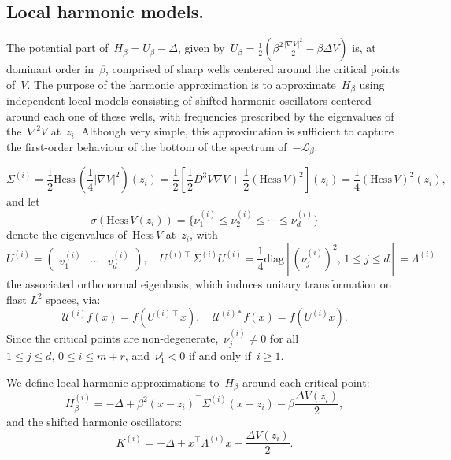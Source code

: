 \documentclass[10pt]{article}
\newcommand{\cL}{\mathcal{L}}
\newcommand{\Hess}{\mathrm{Hess}\,}
\newcommand{\1}{\mathbbm 1}
\newcommand{\Ki}[1]{K^{(i)}_{#1}}
\begin{document}
    \subsection{Local harmonic models.\newline}\label{subsec:local_oscillators}
    The potential part of~$H_\beta = U_\beta - \Delta$, given by~$U_\beta=\frac12\left(\beta^2\frac{|\nabla V|^2}2-\beta\Delta V\right)$ is, at dominant order in~$\beta$, comprised of sharp wells centered around the critical points of~$V$. 
    The purpose of the harmonic approximation is to approximate~$H_\beta$ using independent local models consisting of shifted harmonic oscillators centered around each one of these wells, with frequencies prescribed by the eigenvalues of the~$\nabla^2 V$ at~$z_i$.
    Although very simple, this approximation is sufficient to capture the first-order behaviour of the bottom of the spectrum of~$-\cL_\beta$. 

    \[\Sigma^{(i)} = \frac12\Hess (\frac14|\nabla V|^2)(z_i)  = \frac12\left[\frac12 D^3 V \nabla V + \frac12 \left( \Hess V\right)^2 \right](z_i) = \frac14 \left(\Hess V\right)^2(z_i),\]
    and let
    \[\sigma(\Hess V(z_i)) = \{\nu_1^{(i)} \leq \nu_2^{(i)} \leq \dotsm \leq \nu_d^{(i)}\}\]
    denote the eigenvalues of~$\Hess V$ at~$z_i$, with
    \[U^{(i)} =\begin{pmatrix}v_1^{(i)}&\dotsm&v_d^{(i)}\end{pmatrix},\quad U^{(i)\intercal} \Sigma^{(i)} U^{(i)} = \frac14\mathrm{diag}\left[\left(\nu_j^{(i)}\right)^2,\,1\leq j\leq d\right] = \Lambda^{(i)}\]
    the associated orthonormal eigenbasis, which induces unitary transformation on flast $L^2$ spaces, via:
   ~$$ \mathcal U^{(i)} f(x) = f\left( U^{(i)\intercal}x\right),\quad \mathcal U^{(i)*} f(x) = f\left( U^{(i)}x\right).$$
    Since the critical points are non-degenerate,~$\nu_j^{(i)} \neq 0$ for all~$1\leq j\leq d,\,0\leq i \leq m+r$, and~$\nu_1^{i} < 0$ if and only if~$i\geq 1$.
    
    We define local harmonic approximations to~$H_\beta$ around each critical point:
    \[ H_\beta^{(i)} = -\Delta + \beta^2 (x-z_i)^\intercal \Sigma^{(i)}(x-z_i) - \beta \frac{\Delta V(z_i)}2, \]
    and the shifted harmonic oscillators:
    \[\Ki{} = -\Delta  + x^\intercal \Lambda^{(i)}x -\frac{\Delta V(z_i)}2.\]
\end{document}

